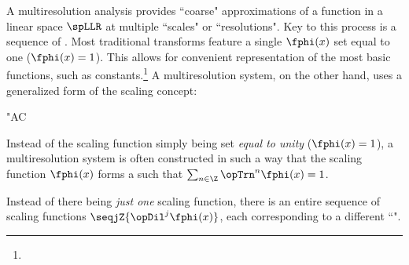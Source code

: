 A multiresolution analysis provides ``coarse" approximations of a function in a linear space $\spLLR$ at multiple
``scales" or ``resolutions".
Key to this process is a sequence of .
Most traditional transforms feature a single  $\fphi(x)$
set equal to one ($\fphi(x)=1$).
This allows for convenient representation of the most basic functions, such as constants.\footnote{}
A multiresolution system, on the other hand, uses a generalized form of the scaling concept:
\begin{dingautolist}{"AC}
  \item Instead of the scaling function simply being set \emph{equal to unity} ($\fphi(x)=1$),
        a multiresolution system  is often constructed in such a way that the scaling function
        $\fphi(x)$ forms a  such that
        $\sum_{n\in\Z} \opTrn^n\fphi(x) = 1$.
  \item Instead of there being \emph{just one} scaling function, there
        is an entire sequence of scaling functions $\seqjZ{\opDil^j\fphi(x)}$,
        each corresponding to a different ``".
\end{dingautolist}

